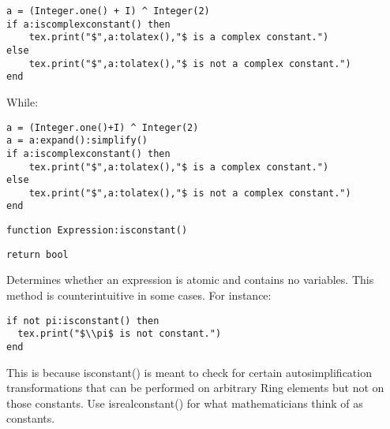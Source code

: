\documentclass{article}
\newcommand{\coderef}[2]{%
\begin{codehead}[sidebyside,segmentation hidden]%
    \texttt{#1}%
    \tcblower%
    \begin{flushright}%
    \texttt{#2}%
    \end{flushright}%
\end{codehead}%
}
\begin{document}
\begin{codebox}[]
    \begin{verbatim}
a = (Integer.one() + I) ^ Integer(2)
if a:iscomplexconstant() then
    tex.print("$",a:tolatex(),"$ is a complex constant.")
else
    tex.print("$",a:tolatex(),"$ is not a complex constant.")
end
\end{verbatim}
\tcblower
\begin{center}
\end{center}
\end{codebox}
While:
\begin{codebox}[]
    \begin{verbatim}
a = (Integer.one()+I) ^ Integer(2)
a = a:expand():simplify()
if a:iscomplexconstant() then
    tex.print("$",a:tolatex(),"$ is a complex constant.")
else
    tex.print("$",a:tolatex(),"$ is not a complex constant.")
end
\end{verbatim}
\tcblower
\begin{center}
\end{center}
\end{codebox}

\coderef{function Expression:isconstant()}{return bool}

Determines whether an expression is atomic and contains no variables. This method is counterintuitive in some cases. For instance:

\begin{codebox}
    \begin{verbatim}
if not pi:isconstant() then
  tex.print("$\\pi$ is not constant.")
end
\end{verbatim}
\tcblower
{}
\end{codebox}
This is because {\ttfamily isconstant()} is meant to check for certain autosimplification  transformations that can be performed on arbitrary {\ttfamily Ring} elements but not on those constants. Use {\ttfamily isrealconstant()} for what mathematicians think of as constants.
\end{document}
